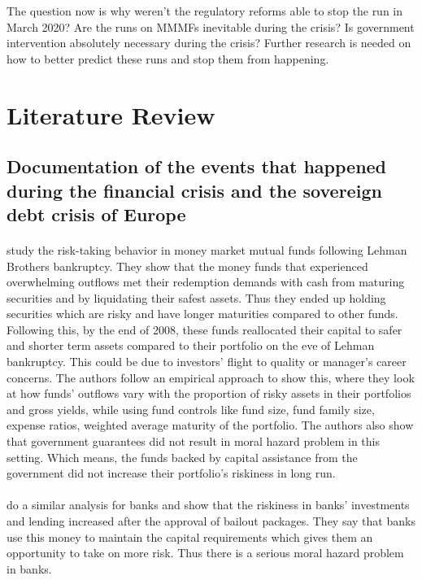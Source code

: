 \documentclass[11pt]{article}
\begin{document}
The question now is why weren't the regulatory reforms able to stop the run in March 2020? Are the runs on MMMFs inevitable during the crisis? Is government intervention absolutely necessary during the crisis? Further research is needed on how to better predict these runs and stop them from happening.

\section{Literature Review} \label{sec:Lit}

\subsection{Documentation of the events that happened during the financial crisis and the sovereign debt crisis of Europe}

\paragraph{} \cite{strahan2015once} study the risk-taking behavior in money market mutual funds following Lehman Brothers bankruptcy. They show that the money funds that experienced overwhelming outflows met their redemption demands with cash from maturing securities and by liquidating their safest assets. Thus they ended up holding securities which are risky and have longer maturities compared to other funds. Following this, by the end of 2008, these funds reallocated their capital to safer and shorter term assets compared to their portfolio on the eve of Lehman bankruptcy. This could be due to investors’ flight to quality or manager’s career concerns. The authors follow an empirical approach to show this, where they look at how funds’ outflows vary with the proportion of risky assets in their portfolios and gross yields, while using fund controls like fund size, fund family size, expense ratios, weighted average maturity of the portfolio. The authors also show that government guarantees did not result in moral hazard problem in this setting. Which means, the funds backed by capital assistance from the government did not increase their portfolio’s riskiness in long run. 

\paragraph{} \cite{duchin2014safer} do a similar analysis for banks and show that the riskiness in banks’ investments and lending increased after the approval of bailout packages. They say that banks use this money to maintain the capital requirements which gives them an opportunity to take on more risk. Thus there is a serious moral hazard problem in banks. 
\end{document}
